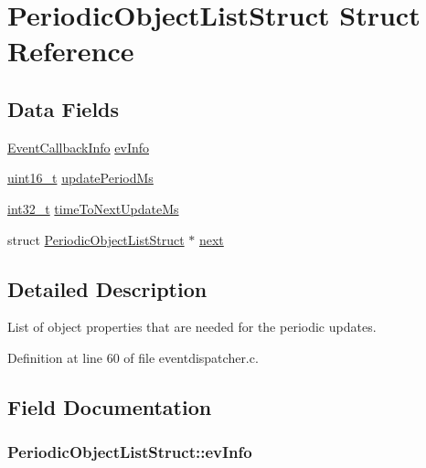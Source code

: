 \hypertarget{struct_periodic_object_list_struct}{\section{Periodic\-Object\-List\-Struct Struct Reference}
\label{struct_periodic_object_list_struct}
}
\subsection*{Data Fields}
\begin{DoxyCompactItemize}
\item 
\hyperlink{struct_event_callback_info}{Event\-Callback\-Info} \hyperlink{struct_periodic_object_list_struct_aa9f3d67a5c62c87059e84abb1cfb857b}{ev\-Info}
\item 
\hyperlink{stdint_8h_a273cf69d639a59973b6019625df33e30}{uint16\-\_\-t} \hyperlink{struct_periodic_object_list_struct_a8473f34184b9b0caa6e10095501984f2}{update\-Period\-Ms}
\item 
\hyperlink{group___n_a_m_e_gafd12020da5a235dfcf0c3c748fb5baed}{int32\-\_\-t} \hyperlink{struct_periodic_object_list_struct_ac03f97c098b138d52415563b1dd2b333}{time\-To\-Next\-Update\-Ms}
\item 
struct \hyperlink{struct_periodic_object_list_struct}{Periodic\-Object\-List\-Struct} $\ast$ \hyperlink{struct_periodic_object_list_struct_a53ed6bc407c59100bcfddb3a49ccb88f}{next}
\end{DoxyCompactItemize}


\subsection{Detailed Description}
List of object properties that are needed for the periodic updates. 

Definition at line 60 of file eventdispatcher.\-c.



\subsection{Field Documentation}
\hypertarget{struct_periodic_object_list_struct_aa9f3d67a5c62c87059e84abb1cfb857b}{
\subsubsection[{ev\-Info}]{ Periodic\-Object\-List\-Struct\-::ev\-Info}}\label{struct_periodic_object_list_struct_aa9f3d67a5c62c87059e84abb1cfb857b}


